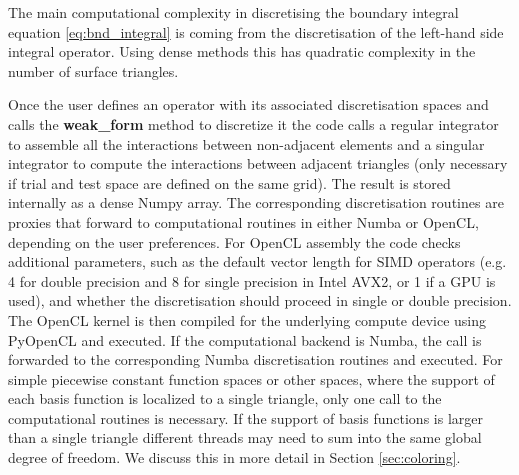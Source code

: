 The main computational complexity in discretising the boundary integral equation \eqref{eq:bnd_integral} is coming from the discretisation of the left-hand side integral operator. Using dense methods this has quadratic complexity in the number of surface triangles.

Once the user defines an operator with its associated discretisation spaces and calls the \textbf{weak\_form} method to discretize it the code calls a regular integrator to assemble all the interactions between non-adjacent elements and a singular integrator to compute the interactions between adjacent triangles (only necessary if trial and test space are defined on the same grid). The result is stored internally as a dense Numpy array. The corresponding discretisation routines are proxies that forward to computational routines in either Numba or OpenCL, depending on the user preferences. For OpenCL assembly the code checks additional parameters, such as the default vector length for SIMD operators (e.g. 4 for double precision and 8 for single precision in Intel AVX2, or 1 if a GPU is used), and whether the discretisation should proceed in single or double precision. The OpenCL kernel is then compiled for the underlying compute device using PyOpenCL and executed. If the computational backend is Numba, the call is forwarded to the corresponding Numba discretisation routines and executed. For simple piecewise constant function spaces or other spaces, where the support of each basis function is localized to a single triangle, only one call to the computational routines is necessary. If the support of basis functions is larger than a single triangle different threads may need to sum into the same global degree of freedom. We discuss this in more detail in Section \ref{sec:coloring}.

